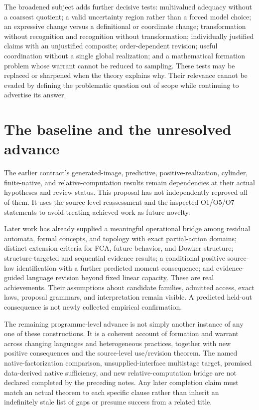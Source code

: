 \documentclass[11pt]{article}
\theoremstyle{definition}
\begin{document}
The broadened subject adds further decisive tests: multivalued adequacy without a coarsest quotient; a valid uncertainty region rather than a forced model choice; an expressive change versus a definitional or coordinate change; transformation without recognition and recognition without transformation; individually justified claims with an unjustified composite; order-dependent revision; useful coordination without a single global realization; and a mathematical formation problem whose warrant cannot be reduced to sampling. These tests may be replaced or sharpened when the theory explains why. Their relevance cannot be evaded by defining the problematic question out of scope while continuing to advertise its answer.

\section{The baseline and the unresolved advance}
\label{app:baseline}

The earlier contract's generated-image, predictive, positive-realization, cylinder, finite-native, and relative-computation results remain dependencies at their actual hypotheses and review status. This proposal has not independently reproved all of them. It uses the source-level reassessment and the inspected O1/O5/O7 statements to avoid treating achieved work as future novelty.

Later work has already supplied a meaningful operational bridge among residual automata, formal concepts, and topology with exact partial-action domains; distinct extension criteria for FCA, future behavior, and Dowker structure; structure-targeted and sequential evidence results; a conditional positive source-law identification with a further predicted moment consequence; and evidence-guided language revision beyond fixed linear capacity. These are real achievements. Their assumptions about candidate families, admitted access, exact laws, proposal grammars, and interpretation remain visible. A predicted held-out consequence is not newly collected empirical confirmation.

The remaining programme-level advance is not simply another instance of any one of these constructions. It is a coherent account of formation and warrant across changing languages and heterogeneous practices, together with new positive consequences and the source-level use/revision theorem. The named native-factorization comparison, unsupplied-interface multistage target, promised data-derived native sufficiency, and new relative-computation bridge are not declared completed by the preceding notes. Any later completion claim must match an actual theorem to each specific clause rather than inherit an indefinitely stale list of gaps or presume success from a related title.
\end{document}
